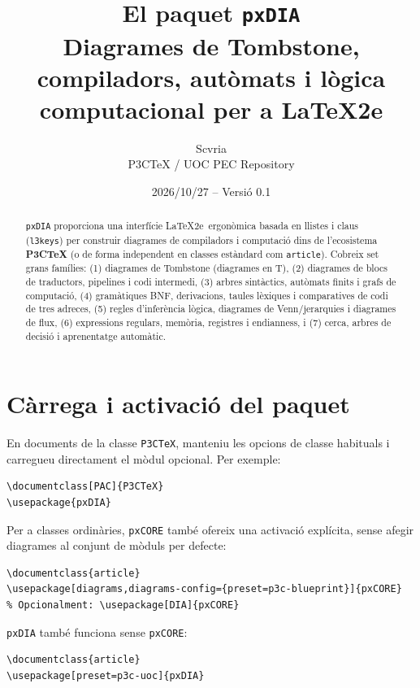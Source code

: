 \documentclass[11pt,a4paper]{article}
\title{El paquet \texttt{pxDIA}\\
  \large Diagrames de Tombstone, compiladors, aut\`omats i l\`ogica computacional per a \LaTeX2e}
\author{Scvria\\P3CTeX / UOC PEC Repository}
\date{2026/10/27 -- Versi\'o 0.1}
\begin{document}
\maketitle

\begin{abstract}
  \texttt{pxDIA} proporciona una interf\'icie \LaTeX2e\ ergon\`omica basada en llistes i claus
  (\texttt{l3keys}) per construir diagrames de compiladors i computaci\'o dins de l'ecosistema
  \textbf{P3CTeX} (o de forma independent en classes est\`andard com \texttt{article}).
  Cobreix set grans fam\'ilies: (1) diagrames de Tombstone (diagrames en T),
  (2) diagrames de blocs de traductors, pipelines i codi intermedi,
  (3) arbres sint\`actics, aut\`omats finits i grafs de computaci\'o,
  (4) gram\`atiques BNF, derivacions, taules l\`exiques i comparatives de codi de tres adreces,
  (5) regles d'infer\`encia l\`ogica, diagrames de Venn/jerarquies i diagrames de flux,
  (6) expressions regulars, mem\`oria, registres i endianness, i
  (7) cerca, arbres de decisi\'o i aprenentatge autom\`atic.
\end{abstract}

\tableofcontents
\newpage

\section{C\`arrega i activaci\'o del paquet}

En documents de la classe \texttt{P3CTeX}, manteniu les opcions de classe
habituals i carregueu directament el m\`odul opcional. Per exemple:

\begin{verbatim}
\documentclass[PAC]{P3CTeX}
\usepackage{pxDIA}
\end{verbatim}

Per a classes ordin\`aries, \texttt{pxCORE} tamb\'e ofereix una activaci\'o
expl\'icita, sense afegir diagrames al conjunt de m\`oduls per defecte:

\begin{verbatim}
\documentclass{article}
\usepackage[diagrams,diagrams-config={preset=p3c-blueprint}]{pxCORE}
% Opcionalment: \usepackage[DIA]{pxCORE}
\end{verbatim}

\texttt{pxDIA} tamb\'e funciona sense \texttt{pxCORE}:

\begin{verbatim}
\documentclass{article}
\usepackage[preset=p3c-uoc]{pxDIA}
\end{verbatim}
\end{document}
